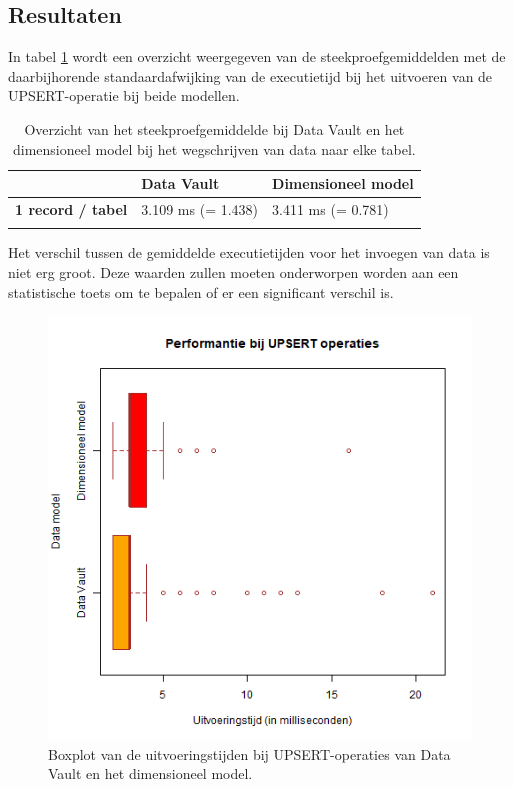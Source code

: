 \subsection{Resultaten}
In tabel \ref{tab:spgups} wordt een overzicht weergegeven van de steekproefgemiddelden met de daarbijhorende standaardafwijking van de executietijd bij het uitvoeren van de UPSERT-operatie bij beide modellen.

\begin{center}
	\renewcommand{\arraystretch}{2}%
	\begin{longtable}{  l  p{}  p{} }
		\ & \textbf{Data Vault} & \textbf{Dimensioneel model} \\ \hline
		\textbf{1 record / tabel} & 3.109 ms (\sigma = 1.438) & 3.411 ms (\sigma = 0.781) \\
		\caption{Overzicht van het steekproefgemiddelde bij Data Vault en het dimensioneel model bij het wegschrijven van data naar elke tabel.}
		\label{tab:spgups}
	\end{longtable}
\end{center}

Het verschil tussen de gemiddelde executietijden voor het invoegen van data is niet erg groot. Deze waarden zullen moeten onderworpen worden aan een statistische toets om te bepalen of er een significant verschil is.

\begin{figure}[H]
	\centering
	\includegraphics[scale=0.6]{../images/Score_upsert.png}
	\caption{Boxplot van de uitvoeringstijden bij UPSERT-operaties van Data Vault en het dimensioneel model. }
	\label{fig:boxplotupsert}
\end{figure}

